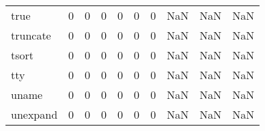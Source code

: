 \begin{longtable}{lrrrrrrrrr}
true      &                                       0 &                                                  0 &                                                  0 &                                                  0 &                                                  0 &                                                  0 &                                                NaN &                                    NaN &                                  NaN \\
truncate  &                                       0 &                                                  0 &                                                  0 &                                                  0 &                                                  0 &                                                  0 &                                                NaN &                                    NaN &                                  NaN \\
tsort     &                                       0 &                                                  0 &                                                  0 &                                                  0 &                                                  0 &                                                  0 &                                                NaN &                                    NaN &                                  NaN \\
tty       &                                       0 &                                                  0 &                                                  0 &                                                  0 &                                                  0 &                                                  0 &                                                NaN &                                    NaN &                                  NaN \\
uname     &                                       0 &                                                  0 &                                                  0 &                                                  0 &                                                  0 &                                                  0 &                                                NaN &                                    NaN &                                  NaN \\
unexpand  &                                       0 &                                                  0 &                                                  0 &                                                  0 &                                                  0 &                                                  0 &                                                NaN &                                    NaN &                                  NaN \\

\end{longtable}
